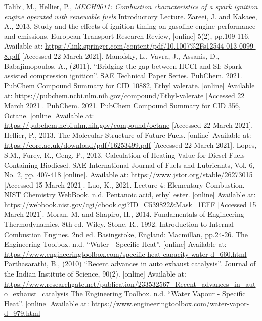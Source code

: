 \documentclass[11pt]{article}
\begin{document}
\begin{thebibliography}{00}
 Talibi, M., Hellier, P., \textit{MECH0011: Combustion characteristics of a spark ignition engine operated with renewable fuels} Introductory Lecture.
 Zareei, J. and Kakaee, A., 2013. Study and the effects of ignition timing on gasoline engine performance and emissions. European Transport Research Review, [online] 5(2), pp.109-116. Available at: \url{https://link.springer.com/content/pdf/10.1007\%2Fs12544-013-0099-8.pdf} [Accessed 22 March 2021]. 
 Manofsky, L., Vavra, J., Assanis, D., Babajimopoulos, A., (2011). ``Bridging the gap between HCCI and SI: Spark-assisted compression ignition''. SAE Technical Paper Series. 
 PubChem. 2021. PubChem Compound Summary for CID 10882, Ethyl valerate. [online] Available at: \url{https://pubchem.ncbi.nlm.nih.gov/compound/Ethyl-valerate} [Accessed 22 March 2021]. 
 PubChem. 2021. PubChem Compound Summary for CID 356, Octane. [online] Available at: \url{https://pubchem.ncbi.nlm.nih.gov/compound/octane} [Accessed 22 March 2021]. 
 Hellier, P., 2013. The Molecular Structure of Future Fuels. [online] Available at: \url{https://core.ac.uk/download/pdf/16253499.pdf} [Accessed 22 March 2021]. 
 Lopes, S.M., Furey, R., Geng, P., 2013. Calculation of Heating Value for Diesel Fuels Containing Biodiesel. SAE International Journal of Fuels and Lubricants, Vol. 6, No. 2, pp. 407-418 [online]. Available at: \url{https://www.jstor.org/stable/26273015} [Accessed 15 March 2021]. 
 Luo, K., 2021. Lecture 4: Elementary Combustion.  
 NIST Chemistry WebBook. n.d. Pentanoic acid, ethyl ester. [online] Available at: \url{https://webbook.nist.gov/cgi/cbook.cgi?ID=C539822&Mask=1EFF} [Accessed 15 March 2021]. 
 Moran, M. and Shapiro, H., 2014. Fundamentals of Engineering Thermodynamics. 8th ed. Wiley. 
 Stone, R., 1992. Introduction to Internal Combustion Engines. 2nd ed. Basingstoke, England: Macmillan, pp.24-26.  
The Engineering Toolbox. n.d. ``Water - Specific Heat''. [online] Available at: \url{https://www.engineeringtoolbox.com/specific-heat-capacity-water-d_660.html}
 Parthasarathi, B., (2010) ``Recent advances in auto exhaust catalysis''. Journal of the Indian Institute of Science, 90(2). [online] Available at: \url{https://www.researchgate.net/publication/233532567_Recent_advances_in_auto_exhaust_catalysis}
 The Engineering Toolbox. n.d. ``Water Vapour - Specific Heat''. [online] Available at: \url{https://www.engineeringtoolbox.com/water-vapor-d_979.html}

\end{thebibliography}
\end{document}
